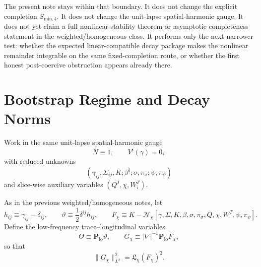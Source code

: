 \documentclass[11pt]{article}
\begin{document}
The present note stays within that boundary. It does not change the explicit completion \(S_{\mathrm{min},4}\). It does not change the unit-lapse spatial-harmonic gauge. It does not yet claim a full nonlinear-stability theorem or asymptotic completeness statement in the weighted/homogeneous class. It performs only the next narrower test: whether the expected linear-compatible decay package makes the nonlinear remainder integrable on the same fixed-completion route, or whether the first honest post-coercive obstruction appears already there.

\section{Bootstrap Regime and Decay Norms}

Work in the same unit-lapse spatial-harmonic gauge
\begin{equation}
N\equiv 1,
\qquad
V^i(\gamma)=0,
\label{eq:gauge}
\end{equation}
with reduced unknowns
\begin{equation}
(\gamma_{ij},\Sigma_{ij},K;\beta^i;\sigma,\pi_\sigma;\psi,\pi_\psi)
\label{eq:unknowns}
\end{equation}
and slice-wise auxiliary variables \((Q^I,\chi,W_i^T)\).

As in the previous weighted/homogeneous notes, let
\begin{equation}
h_{ij}\equiv \gamma_{ij}-\delta_{ij},
\qquad
\vartheta \equiv \frac12\delta^{ij}h_{ij},
\qquad
F_\chi
\equiv
K-\mathcal N_\chi[\gamma,\Sigma,K,\beta,\sigma,\pi_\sigma,Q,\chi,W^T,\psi,\pi_\psi].
\label{eq:basicdefs}
\end{equation}
Define the low-frequency trace--longitudinal variables
\begin{equation}
\Theta \equiv \mathbf P_{\mathrm{lo}}\vartheta,
\qquad
G_\chi \equiv |\nabla|^{-1}\mathbf P_{\mathrm{lo}}F_\chi,
\label{eq:ThetaG}
\end{equation}
so that
\[
\|G_\chi\|_{L^2}^2 = \mathfrak L_\chi(F_\chi)^2.
\]
\end{document}
